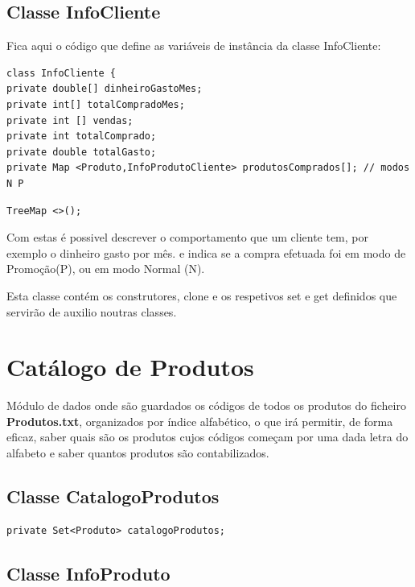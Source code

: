 \subsection{Classe InfoCliente}

Fica aqui o código que define as variáveis de instância da classe InfoCliente:

\begin{Verbatim}
class InfoCliente {
private double[] dinheiroGastoMes;
private int[] totalCompradoMes;
private int [] vendas;
private int totalComprado;
private double totalGasto;
private Map <Produto,InfoProdutoCliente> produtosComprados[]; // modos N P

\end{Verbatim}

\begin{verbatim}
TreeMap <>();
\end{verbatim}



Com estas é possivel descrever o comportamento que um cliente tem, por exemplo o dinheiro gasto por mês. 
 e indica se a compra efetuada foi em modo de Promoção(P), ou em modo Normal (N). 


Esta classe contém os construtores, clone e os respetivos set e get definidos que servirão de auxilio noutras classes. 



\section{Catálogo de Produtos}

 Módulo de dados onde são guardados os códigos de todos os produtos do ficheiro \textbf{Produtos.txt}, organizados por índice alfabético, o que irá permitir, de forma eficaz, saber quais são os produtos cujos códigos começam por uma dada letra do alfabeto e saber quantos produtos são contabilizados. 
 
 \subsection{Classe CatalogoProdutos}

\begin{verbatim}
private Set<Produto> catalogoProdutos;
\end{verbatim}

\subsection{Classe InfoProduto}

